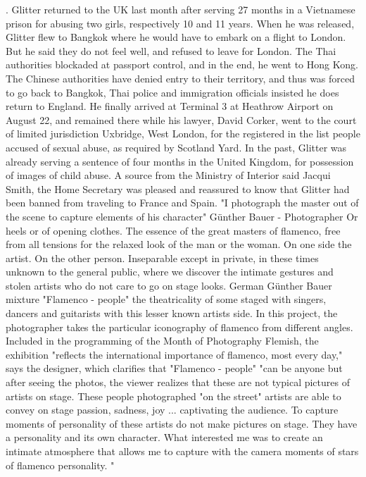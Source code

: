 . Glitter returned to the UK last month after serving 27 months in a Vietnamese prison for abusing two girls, respectively 10 and 11 years.
When he was released, Glitter flew to Bangkok where he would have to embark on a flight to London.
But he said they do not feel well, and refused to leave for London.
The Thai authorities blockaded at passport control, and in the end, he went to Hong Kong.
The Chinese authorities have denied entry to their territory, and thus was forced to go back to Bangkok, Thai police and immigration officials insisted he does return to England.
He finally arrived at Terminal 3 at Heathrow Airport on August 22, and remained there while his lawyer, David Corker, went to the court of limited jurisdiction Uxbridge, West London, for the registered in the list people accused of sexual abuse, as required by Scotland Yard.
In the past, Glitter was already serving a sentence of four months in the United Kingdom, for possession of images of child abuse.
A source from the Ministry of Interior said Jacqui Smith, the Home Secretary was pleased and reassured to know that Glitter had been banned from traveling to France and Spain.
"I photograph the master out of the scene to capture elements of his character" Günther Bauer - Photographer
Or heels or of opening clothes.
The essence of the great masters of flamenco, free from all tensions for the relaxed look of the man or the woman.
On one side the artist.
On the other person.
Inseparable except in private, in these times unknown to the general public, where we discover the intimate gestures and stolen artists who do not care to go on stage looks.
German Günther Bauer mixture "Flamenco - people" the theatricality of some staged with singers, dancers and guitarists with this lesser known artists side.
In this project, the photographer takes the particular iconography of flamenco from different angles.
Included in the programming of the Month of Photography Flemish, the exhibition "reflects the international importance of flamenco, most every day," says the designer, which clarifies that "Flamenco - people" "can be anyone but after seeing the photos, the viewer realizes that these are not typical pictures of artists on stage.
These people photographed "on the street" artists are able to convey on stage passion, sadness, joy ... captivating the audience.
To capture moments of personality of these artists do not make pictures on stage.
They have a personality and its own character.
What interested me was to create an intimate atmosphere that allows me to capture with the camera moments of stars of flamenco personality. "
